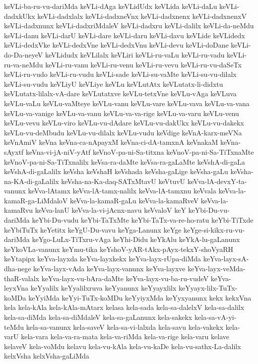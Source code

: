 {keVLi-ba-ru-vu-dariMda
keVLi-dAga
keVLidUdx
keVLida
keVLi-daLu
keVLi-dadxkUkx
keVLi-dadxlalx
keVLi-dadxneVnx
keVLi-dadxnenx
keVLi-dadxnenxV
keVLi-dadxnunx
keVLi-dadxriMdaleV
keVLi-dadxru
keVLi-dalilx
keVLi-da-neMdu
keVLi-danu
keVLi-darU
keVLi-dare
keVLi-daru
keVLi-davu
keVLide
keVLidedx
keVLi-dedxVke
keVLi-dedxVne
keVLi-dedxVnu
keVLi-devu
keVLi-doDane
keVLi-do-Da-neyeV
keVLidudx
keVLilalx
keVLiri
keVLi-ru-vaLu
keVLi-ru-vadu
keVLi-ru-va-neMdu
keVLi-ru-vanu
keVLi-ru-venu
keVLi-ru-vevu
keVLi-ru-vu-daSeTx
keVLi-ru-vudo
keVLi-ru-vudu
keVLi-sade
keVLi-su-vaMte
keVLi-su-vu-dilalx
keVLi-su-vudu
keVLiyU
keVLiye
keVLu
keVLutAtx
keVLutatx-li-didxtu
keVLutatx-lilalx-vA-dare
keVLutatxve
keVLu-tetxVne
keVLu-vAga
keVLuva
keVLu-vaLu
keVLu-vaMteye
keVLu-vanu
keVLu-vare
keVLu-vava
keVLu-va-vana
keVLu-va-vanige
keVLu-va-vanu
keVLu-va-va-rige
keVLu-va-varu
keVLu-venu
keVLu-vevu
keVLu-viro
keVLu-vu-dAdare
keVLu-vu-dakUkx
keVLu-vu-dakekx
keVLu-vu-deMbudu
keVLu-vu-dilalx
keVLu-vudu
keVdige
keVnA-karx-meVNa
keVnAmiV
keVna
keVna-ca-nApayxM
keVna-ci-dA-tamxnA
keVnakaM
keVna-sAyxtf
keVna-vi-jA-niV-yAtf
keVnoV-pa-ni-Sa-titxna
keVnoV-pa-ni-Sa-TiTxnaMte
keVnoV-pa-ni-Sa-TiTxnalilx
keVsa-ra-daMte
keVsa-ra-gaLaMte
keVshA-di-gaLa
keVshA-di-gaLalilx
keVsha
keVshaH
keVshada
keVsha-gaLige
keVsha-gaLu
keVsha-na-KA-di-gaLalilx
keVsha-na-Ka-daq-SATxMtavU
keVtuvU
keVva-lA-devxY-ta-vanunx
keVva-lAtamx
keVva-lA-tamx-nalilx
keVva-lA-tamxnu
keVvala
keVva-la-kamaR-ga-LiMdaloV
keVva-la-kamaR-gaLu
keVva-la-kamaRveV
keVva-la-kamaRvu
keVva-lanU
keVva-la-vi-jAcnx-navu
keVvaloV
keY
keYbi-Du-vu-dariMda
keYbi-Du-vudu
keYbi-TaTxMte
keYbi-TaTx-va-re-ho-ratu
keYbi-TiTxde
keYbiTuTx
keYetitx
keYgU-Du-vavu
keYga-Lanunx
keYge
keYge-si-kikx-ru-vu-dariMda
keYgo-LuLx-TiTxru-vAga
keYhi-Didu
keYkAlu
keYkA-lu-gaLanunx
keYkoVLa-vanunx
keYmu-tika
keYshoV-yAR-tAkx-pAyx-tekxY-shoVyaRH
keYtapipx
keYva-layxda
keYva-layxkekx
keYva-layx-rUpa-diMda
keYva-layx-sA-dha-nege
keYva-layx-vAda
keYva-layx-vanunx
keYva-layxve
keYva-layx-veMda-thaR-valalx
keYva-layx-vu-bAra-daMte
keYva-layx-vu-ba-ru-vudeV
keYva-leyxVna
keYyalilx
keYyalilxruva
keYyanunx
keYyayxlilx
keYyayx-lilx-TuTx-koMDa
keYyiMda
keYyi-TuTx-koMDu
keYyiyxMda
keYyxyanunx
kekx
kekxVna
kela
kela-kAla
kela-kAla-mAtarx
kelasa
kela-sada
kela-sa-dalelxV
kela-sa-dalilx
kela-sa-diMda
kela-sa-diMdaleV
kela-sa-gaLanunx
kela-sakekx
kela-sa-vA-yi-teMdu
kela-sa-vanunx
kela-saveV
kela-sa-vi-lalxda
kela-savu
kela-vakekx
kela-varU
kela-vara
kela-va-ra-mata
kela-va-riMda
kela-va-rige
kela-varu
kelave
kelaveV
kela-voMdu
kelavu
kela-vu-kAla
kela-vu-kaDe
kela-vu-sathx-La-dalilx
kelxVsha
kelxVsha-gaLiMda
}
